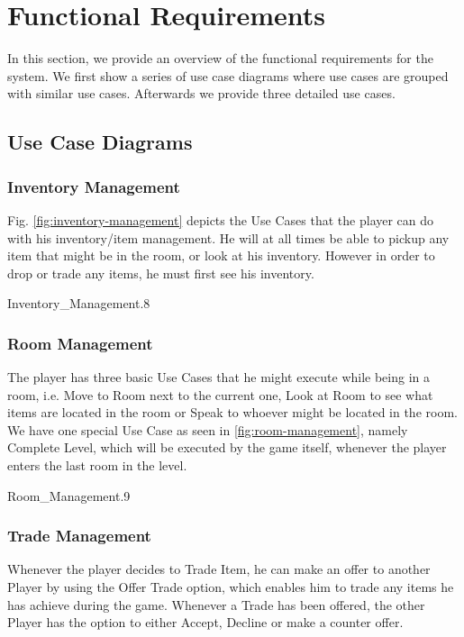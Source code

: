 \section{Functional Requirements}
In this section, we provide an overview of the functional requirements for the system. We first show a series of use case diagrams where use cases are grouped with similar use cases. Afterwards we provide three detailed use cases.

\subsection{Use Case Diagrams}

\subsubsection*{Inventory Management}
Fig. \ref{fig:inventory-management} depicts the Use Cases that the player can do with his inventory/item management. He will at all times be able to pickup any item that might be in the room, or look at his inventory. However in order to drop or trade any items, he must first see his inventory. 

\begin{myfigure}{Inventory_Management}{.8}%
	\caption{Inventory Management}
	\label{fig:inventory-management}
\end{myfigure}

\subsubsection*{Room Management}
The player has three basic Use Cases that he might execute while being in a room, i.e. Move to Room next to the current one, Look at Room to see what items are located in the room or Speak to whoever might be located in the room. We have one special Use Case as seen in \ref{fig:room-management}, namely Complete Level, which will be executed by the game itself, whenever the player enters the last room in the level. 

\begin{myfigure}{Room_Management}{.9}%
	\caption{Room Management}
	\label{fig:room-management}
\end{myfigure}

\subsubsection*{Trade Management}
Whenever the player decides to Trade Item, he can make an offer to another Player by using the Offer Trade option, which enables him to trade any items he has achieve during the game. Whenever a Trade has been offered, the other Player has the option to either Accept,  Decline or make a counter offer. 

